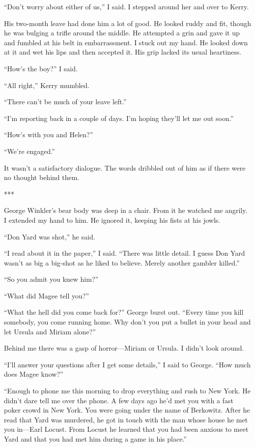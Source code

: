 \documentclass{novel}
\begin{document}
{“Don’t worry about either of us,” I said. I stepped around her and over to Kerry.

His two-month leave had done him a lot of good. He looked ruddy and fit, though he was bulging a trifle around the middle. He attempted a grin and gave it up and fumbled at his belt in embarrassment. I stuck out my hand. He looked down at it and wet his lips and then accepted it. His grip lacked its usual heartiness.

“How’s the boy?” I said.

“All right,” Kerry mumbled.

“There can’t be much of your leave left.”

“I’m reporting back in a couple of days. I’m hoping they’ll let me out soon.”

“How’s with you and Helen?”

“We’re engaged.”

It wasn’t a satisfactory dialogue. The words dribbled out of him as if there were no thought behind them.

***

George Winkler’s bear body was deep in a chair. From it he watched me angrily. I extended my hand to him. He ignored it, keeping his fists at his jowls.

“Don Yard was shot,” he said.

“I read about it in the paper,” I said. “There was little detail. I guess Don Yard wasn’t as big a big-shot as he liked to believe. Merely another gambler killed.”

“So you admit you knew him?”

“What did Magee tell you?”

“What the hell did you come back for?” George burst out. “Every time you kill somebody, you come running home. Why don’t you put a bullet in your head and let Ursula and Miriam alone?”

Behind me there was a gasp of horror—Miriam or Ursula. I didn’t look around.

“I’ll answer your questions after I get some details,” I said to George. “How much does Magee know?”

“Enough to phone me this morning to drop everything and rush to New York. He didn’t dare tell me over the phone. A few days ago he’d met you with a fast poker crowd in New York. You were going under the name of Berkowitz. After he read that Yard was murdered, he got in touch with the man whose house he met you in—Earl Locust. From Locust he learned that you had been anxious to meet Yard and that you had met him during a game in his place.”

}
\end{document}
